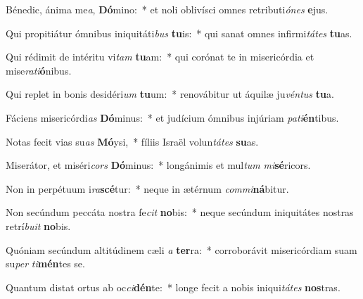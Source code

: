 \item Bénedic, ánima me\textit{a}, \textbf{Dó}mino:~* et noli oblivísci omnes retributi\textit{ó}\textit{nes} \textbf{e}jus.
\item Qui propitiátur ómnibus iniquitáti\textit{bus} \textbf{tu}is:~* qui sanat omnes infirmi\textit{tá}\textit{tes} \textbf{tu}as.
\item Qui rédimit de intéritu vi\textit{tam} \textbf{tu}am:~* qui corónat te in misericórdia et mise\textit{ra}\textit{ti}\textbf{ó}nibus.
\item Qui replet in bonis desidéri\textit{um} \textbf{tu}um:~* renovábitur ut áquilæ ju\textit{vén}\textit{tus} \textbf{tu}a.
\item Fáciens misericórdi\textit{as} \textbf{Dó}minus:~* et judícium ómnibus injúriam \textit{pa}\textit{ti}\textbf{én}tibus.
\item Notas fecit vias su\textit{as} \textbf{Mó}ysi,~* fíliis Israël volun\textit{tá}\textit{tes} \textbf{su}as.
\item Miserátor, et miséri\textit{cors} \textbf{Dó}minus:~* longánimis et mul\textit{tum} \textit{mi}\textbf{sé}ricors.
\item Non in perpétuum i\textit{ra}\textbf{scé}tur:~* neque in ætérnum \textit{com}\textit{mi}\textbf{ná}bitur.
\item Non secúndum peccáta nostra fe\textit{cit} \textbf{no}bis:~* neque secúndum iniquitátes nostras retrí\textit{bu}\textit{it} \textbf{no}bis.
\item Quóniam secúndum altitúdinem cæli \textit{a} \textbf{ter}ra:~* corroborávit misericórdiam suam su\textit{per} \textit{ti}\textbf{mén}tes se.
\item Quantum distat ortus ab oc\textit{ci}\textbf{dén}te:~* longe fecit a nobis iniqui\textit{tá}\textit{tes} \textbf{nos}tras.
